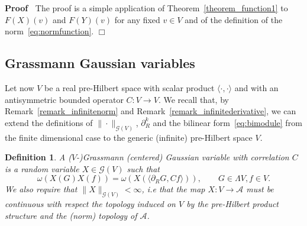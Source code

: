\documentclass{article}
\newenvironment{proof}{\noindent\textbf{Proof\ }}{\hspace*{\fill}$\Box$\medskip}
\newtheorem{definition}[theorem]{Definition}
\begin{document}
\begin{proof}
  The proof is a simple application of Theorem~\ref{theorem_function1} to $F
  (X) (v)$ and $F (Y) (v)$ for any fixed $v \in V$ and of the definition of
  the norm~{\eqref{eq:normfunction}}.
\end{proof}

\subsection{Grassmann Gaussian variables}\label{sec:gaussians}

Let now $V$ be a real pre-Hilbert space with scalar product $\langle \cdot,
\cdot \rangle$ and with an antisymmetric bounded operator $C : V \rightarrow
V$. We recall that, by Remark~\ref{remark_infinitenorm} and
Remark~\ref{remark_infinitederivative}, we can extend the definitions of $\|
\cdot \|_{\mathcal{G} (V)}$, $\partial_R^k$ and the bilinear
form~{\eqref{eq:bimodule}} from the finite dimensional case to the generic
(infinite) pre-Hilbert space $V$.

\begin{definition}
  A ($V$-)Grassmann (centered) Gaussian variable with correlation $C$ is a
  random variable $X \in \mathcal{G} (V)$ such that
  \begin{equation}
    \omega (X (G) X (f)) = \omega (X (\langle \partial_R G, C f \rangle)),
    \qquad G \in \Lambda V, f \in V. \label{eq:ibp-r}
  \end{equation}
  We also require that $\| X \|_{\mathcal{G} (V)} < \infty$, i.e that the map
  $X : V \rightarrow \mathcal{A}$ must be continuous with respect the topology
  induced on $V$ by the pre-Hilbert product structure and the (norm) topology
  of $\mathcal{A}$.
\end{definition}
\end{document}

